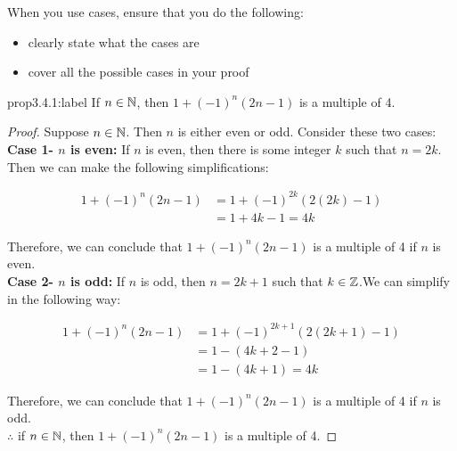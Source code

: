 When you use cases, ensure that you do the following:
\begin{itemize}
    \item clearly state what the cases are
    \item cover all the possible cases in your proof
\end{itemize}

\begin{proposition}{prop3.4.1:label}
    If $n \in \mathbb{N}$, then $1 + (-1)^n(2n-1)$ is a multiple of 4.
\end{proposition}

\begin{proof}
    Suppose $n \in \mathbb{N}$. Then $n$ is either even or odd. Consider these two cases:\\

    \textbf{Case 1- $n$ is even:} If $n$ is even, then there is some integer  $k$ such that $n = 2k$. Then we can make the following simplifications:
    
    \[
        \begin{aligned}
            1+(-1)^n(2n-1)&=1+(-1)^{2k}(2(2k)-1)\\
            &= 1 + 4k -1 = 4k
        \end{aligned}
    \]

    Therefore, we can conclude that $1+(-1)^n(2n-1)$ is a multiple of 4 if $n$ is even.\\

    \textbf{Case 2- $n$ is odd:} If $n$ is odd, then $n=2k+1$ such that $k\in\mathbb{Z}$.We can simplify in the following way:
    
    \[
    \begin{aligned}
        1+(-1)^n(2n-1) &= 1+(-1)^{2k+1}(2(2k+1)-1)\\
        &= 1 -(4k+2-1)\\
        &=1-(4k+1)=4k
    \end{aligned}
    \]

    Therefore, we can conclude that $1+(-1)^n(2n-1)$ is a multiple of 4 if $n$ is odd.\\

    $\therefore$ if $n \in \mathbb{N}$, then $1 + (-1)^n(2n-1)$ is a multiple of 4. 
\end{proof}

